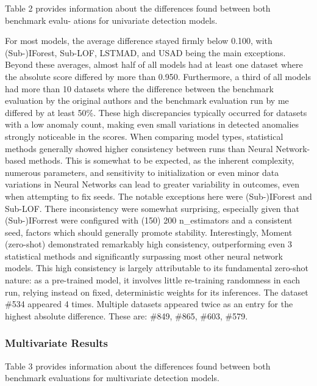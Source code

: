 \documentclass[12pt,oneside]{article}
\begin{document}
Table 2 provides information about the differences found between both benchmark evalu-
ations for univariate detection models. \par
For most models, the average difference stayed firmly below 0.100, with (Sub-)IForest, Sub-LOF, LSTMAD, and USAD being the main exceptions. Beyond these averages, almost half of all models had at least one dataset where the absolute score differed by more than 0.950. Furthermore, a third of all models had more than 10 datasets where the difference between the benchmark evaluation by the original authors and the benchmark evaluation run by me differed by at least 50\%. These high discrepancies typically occurred for datasets with a low anomaly count, making even small variations in detected anomalies strongly noticeable in the scores. When comparing model types, statistical methods generally showed higher consistency between runs than Neural Network-based methods. This is somewhat to be expected, as the inherent complexity, numerous parameters, and sensitivity to initialization or even minor data variations in Neural Networks can lead to greater variability in outcomes, even when attempting to fix seeds. The notable exceptions here were (Sub-)IForest and Sub-LOF. There inconsistency were somewhat surprising, especially given that (Sub-)IForrest were configured with (150) 200 n\_estimators and a consistent seed, factors which should generally promote stability. Interestingly, Moment (zero-shot) demonstrated remarkably high consistency, outperforming even 3 statistical methods and significantly surpassing most other neural network models. This high consistency is largely attributable to its fundamental zero-shot nature: as a pre-trained model, it involves little re-training randomness in each run, relying instead on fixed, deterministic weights for its inferences. The dataset \#534 appeared 4 times. Multiple datasets appeared twice as an entry for the highest absolute difference. These are: \#849, \#865, \#603, \#579.

\subsubsection{Multivariate Results}

Table 3 provides information about the differences found between both benchmark evaluations for multivariate detection models.
\end{document}
